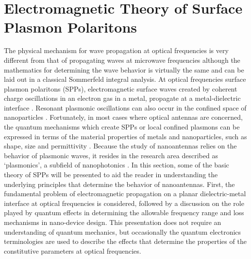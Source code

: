 \documentclass[11pt]{article}
\begin{document}
\section{Electromagnetic Theory of Surface Plasmon Polaritons}
%
The physical mechanism for wave propagation at optical frequencies is very different from that of propagating waves at microwave frequencies although the mathematics for determining the wave behavior is virtually the same and can be laid out in a classical Sommerfeld integral analysis. At optical frequencies surface plasmon polaritons (SPPs), electromagnetic surface waves created by coherent charge oscillations in an electron gas in a metal, propagate at a metal-dielectric interface \cite{Ritchie1957,otto1976spectroscopy, Raether1988}. Resonant plasmonic oscillations can also occur in the confined space of nanoparticles \cite{Nie1997}. Fortunately, in most cases where optical antennas are concerned, the quantum mechanisms which create SPPs or local confined plasmons can be expressed in terms of the material properties of metals and nanoparticles, such as shape, size and permittivity \cite{Kelly2003}. Because the study of nanoantennas relies on the behavior of
plasmonic waves, it resides in the research area described as `plasmonics', a
subfield of nanophotonics \cite{Maier2005, Park2009}. In this section, some of the basic theory of SPPs will be presented to aid the reader in understanding the underlying principles that determine the behavior of nanoantennas. First, the fundamental problem of electromagnetic propagation on a planar dielectric-metal interface at optical frequencies is considered, followed by a discussion on the role played by quantum effects in determining the allowable frequency range and loss mechanisms in nano-device design. This presentation does not require an understanding of quantum mechanics, but occasionally the quantum electronics terminologies are used to describe the effects that determine the properties of the constitutive parameters at optical frequencies.
%
%
%
%
\end{document}
